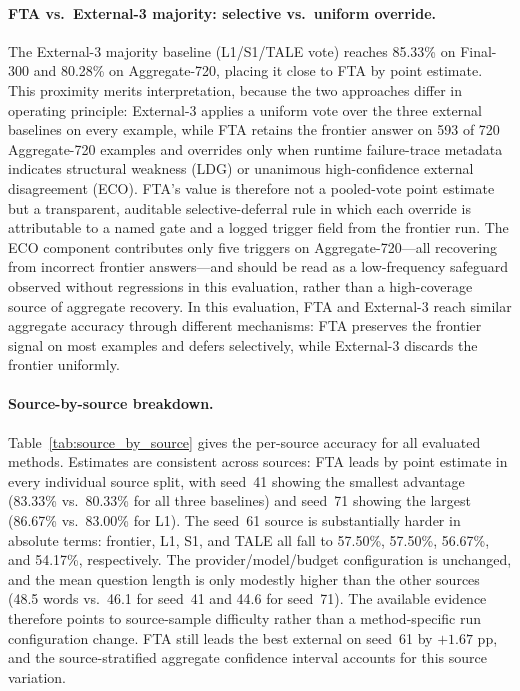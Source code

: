\documentclass[smallcondensed]{svjour3}
\begin{document}
\paragraph{FTA vs.\ External-3 majority: selective vs.\ uniform override.}
The External-3 majority baseline (L1/S1/TALE vote) reaches 85.33\% on Final-300 and
80.28\% on Aggregate-720, placing it close to FTA by point estimate.
This proximity merits interpretation, because the two approaches differ in operating
principle: External-3 applies a uniform vote over the three external baselines on every
example, while FTA retains the frontier answer on 593 of 720 Aggregate-720 examples and
overrides only when runtime failure-trace metadata indicates structural weakness (LDG) or
unanimous high-confidence external disagreement (ECO).
FTA's value is therefore not a pooled-vote point estimate but a transparent, auditable
selective-deferral rule in which each override is attributable to a named gate and a logged
trigger field from the frontier run.
The ECO component contributes only five triggers on Aggregate-720---all recovering from
incorrect frontier answers---and should be read as a low-frequency safeguard observed without regressions
in this evaluation, rather than a high-coverage source of aggregate recovery.
In this evaluation, FTA and External-3 reach similar aggregate accuracy through different
mechanisms: FTA preserves the frontier signal on most examples and defers selectively,
while External-3 discards the frontier uniformly.

\paragraph{Source-by-source breakdown.}
Table~\ref{tab:source_by_source} gives the per-source accuracy for all
evaluated methods.
Estimates are consistent across sources: FTA leads by point estimate in
every individual source split, with seed~41 showing the smallest advantage
(83.33\% vs.\ 80.33\% for all three baselines) and seed~71 showing the
largest (86.67\% vs.\ 83.00\% for L1).
The seed~61 source is substantially harder in absolute terms: frontier, L1,
S1, and TALE all fall to 57.50\%, 57.50\%, 56.67\%, and 54.17\%,
respectively.
The provider/model/budget configuration is unchanged, and the mean question
length is only modestly higher than the other sources (48.5 words vs.\ 46.1
for seed~41 and 44.6 for seed~71).
The available evidence therefore points to source-sample difficulty rather
than a method-specific run configuration change.
FTA still leads the best external on seed~61 by $+1.67$ pp, and the
source-stratified aggregate confidence interval accounts for this source
variation.
\end{document}
